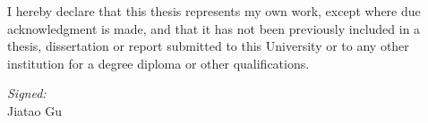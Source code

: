I hereby declare that this thesis represents my own work, except where due acknowledgment is made, and that it has not been previously included in a thesis, dissertation or report submitted to this University or to any other institution for a degree diploma or other qualifications.
\\[2cm]
\begin{flushright}
\textit{Signed:} \underline{\hspace{6cm}}\\[.5cm]
Jiatao Gu
\end{flushright}
\cleardoublepage %
